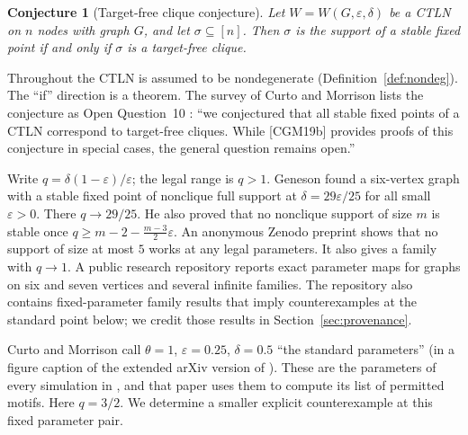\documentclass[11pt]{amsart}
\newtheorem{conjecture}[theorem]{Conjecture}
\theoremstyle{remark}
\begin{document}
\begin{conjecture}[Target-free clique conjecture]\label{conj}
Let $W=W(G,\varepsilon,\delta)$ be a CTLN on $n$ nodes with graph $G$, and let $\sigma\subseteq[n]$. Then $\sigma$ is the support of a stable fixed point if and only if $\sigma$ is a target-free clique.
\end{conjecture}

Throughout \cite{CGM2024} the CTLN is assumed to be nondegenerate (Definition~\ref{def:nondeg}). The ``if'' direction is a theorem. The survey of Curto and Morrison lists the conjecture as Open Question~10 \cite{CurtoMorrison2023}: ``we conjectured that all stable fixed points of a CTLN correspond to target-free cliques. While [CGM19b] provides proofs of this conjecture in special cases, the general question remains open.''

Write $q=\delta(1-\varepsilon)/\varepsilon$; the legal range is $q>1$. Geneson \cite{Geneson2026} found a six-vertex graph with a stable fixed point of nonclique full support at $\delta=29\varepsilon/25$ for all small $\varepsilon>0$. There $q\to29/25$. He also proved that no nonclique support of size $m$ is stable once $q\ge m-2-\frac{m-3}{2}\varepsilon$. An anonymous Zenodo preprint \cite{SixIsMinimal2026} shows that no support of size at most $5$ works at any legal parameters. It also gives a family with $q\to1$. A public research repository \cite{CLTNrepo} reports exact parameter maps for graphs on six and seven vertices and several infinite families. The repository also contains fixed-parameter family results that imply counterexamples at the standard point below; we credit those results in Section~\ref{sec:provenance}.

Curto and Morrison call $\theta=1$, $\varepsilon=0.25$, $\delta=0.5$ ``the standard parameters'' (in a figure caption of the extended arXiv version of \cite{CurtoMorrison2023}). These are the parameters of every simulation in \cite{CGM2024}, and that paper uses them to compute its list of permitted motifs. Here $q=3/2$. We determine a smaller explicit counterexample at this fixed parameter pair.
\end{document}
